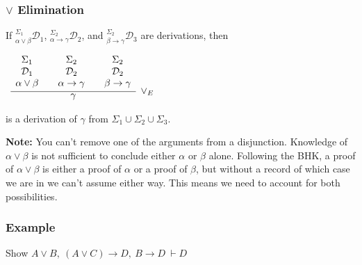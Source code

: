 \documentclass{beamer}
\theoremstyle{indentDefn} \newtheorem{defn}[]{Definition}
\begin{document}
\begin{frame}
	\frametitle{$\lor$ Elimination}
	
	If $^{\Sigma_{1}}_{\alpha\lor\beta}\mathcal{D}_{1}$, $^{\Sigma_{2}}_{\alpha\rightarrow\gamma}\mathcal{D}_{2}$, and $^{\Sigma_{2}}_{\beta\rightarrow\gamma}\mathcal{D}_{3}$ are derivations, then
	
	\begin{center}
	$\begin{array}{ c }
	
		\infer[\lor_{E}]{\gamma}
			{
			\begin{array}{c} \Sigma_{1}  \\ \mathcal{D}_{1} \\ \alpha\lor\beta \end{array}
			 & 
			\begin{array}{c} \Sigma_{2}  \\ \mathcal{D}_{2} \\ \alpha\rightarrow\gamma \end{array}				
			 & 
			\begin{array}{c} \Sigma_{2}  \\ \mathcal{D}_{2} \\ \beta\rightarrow\gamma \end{array}				 
			}	
	
	\end{array}$
	\end{center}
	
	is a derivation of $\gamma$ from $\Sigma_{1}\cup\Sigma_{2}\cup\Sigma_{3}$.
	
	\vspace{0.5cm}
	
	{\bf Note:} You can't remove one of the arguments from a disjunction. Knowledge of $\alpha \lor \beta$ is not sufficient to conclude either $\alpha$ or $\beta$ alone. Following the BHK, a proof of $\alpha \lor \beta$ is either a proof of $\alpha$ or a proof of $\beta$, but without a record of which case we are in we can't assume either way. This means we need to account for both possibilities. 
	
\end{frame}



\begin{frame}
  \frametitle{Example}

	Show $A \lor B, \ (A \lor C)\rightarrow D, \ B \rightarrow D  \ \vdash D$
	
	\vspace{7cm}



\end{frame}
\end{document}
